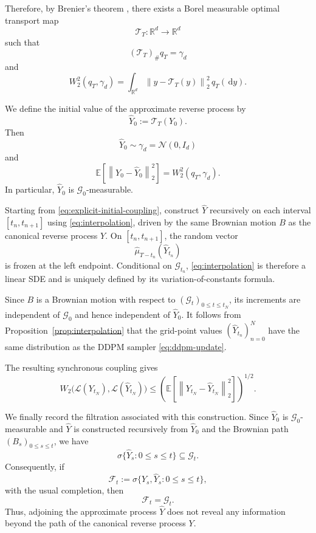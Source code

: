 \documentclass[11pt]{article}
\theoremstyle{definition}
\newcommand{\R}{\mathbb{R}}
\newcommand{\E}{\mathbb{E}}
\newcommand{\Law}{\mathcal{L}}
\newcommand{\N}{\mathcal{N}}
\newcommand{\Id}{I_d}
\newcommand{\Wtwo}{W_2}
\newcommand{\norm}[1]{\left\lVert #1\right\rVert_2}
\newcommand{\dd}{\,\mathrm{d}}
\begin{document}
Therefore, by Brenier's theorem
\citep[Theorem~9.4]{villani2009optimal}, there exists a Borel
measurable optimal transport map
\[
    \mathcal T_T:\R^d\to\R^d
\]
such that
\[
    (\mathcal T_T)_{\#}q_T=\gamma_d
\]
and
\[
    W_2^2(q_T,\gamma_d)
    =
    \int_{\R^d}
    \norm{y-\mathcal T_T(y)}^2\,q_T(\dd y).
\]

We define the initial value of the approximate reverse process by
\begin{equation}
    \hat Y_0:=\mathcal T_T(Y_0).
    \label{eq:explicit-initial-coupling}
\end{equation}
Then
\[
    \hat Y_0\sim\gamma_d=\N(0,\Id)
\]
and
\begin{equation}
    \E\left[\norm{Y_0-\hat Y_0}^2\right]
    =
    W_2^2(q_T,\gamma_d).
    \label{eq:optimal-initial-cost}
\end{equation}
In particular, $\hat Y_0$ is $\mathcal G_0$-measurable.

Starting from \eqref{eq:explicit-initial-coupling}, construct
$\hat Y$ recursively on each interval $[t_n,t_{n+1}]$ using
\eqref{eq:interpolation}, driven by the same Brownian motion $B$ as
the canonical reverse process $Y$. On $[t_n,t_{n+1}]$, the random
vector
\[
    \hat\mu_{T-t_n}(\hat Y_{t_n})
\]
is frozen at the left endpoint. Conditional on $\mathcal G_{t_n}$,
\eqref{eq:interpolation} is therefore a linear SDE and is uniquely
defined by its variation-of-constants formula.

Since $B$ is a Brownian motion with respect to
$(\mathcal G_t)_{0\le t\le t_N}$, its increments are independent of
$\mathcal G_0$ and hence independent of $\hat Y_0$. It follows from
Proposition~\ref{prop:interpolation} that the grid-point values
$(\hat Y_{t_n})_{n=0}^N$ have the same distribution as the DDPM
sampler \eqref{eq:ddpm-update}.

The resulting synchronous coupling gives
\begin{equation}
    \Wtwo\bigl(\Law(Y_{t_N}),\Law(\hat Y_{t_N})\bigr)
    \le
    \left(
        \E\left[\norm{Y_{t_N}-\hat Y_{t_N}}^2\right]
    \right)^{1/2}.
    \label{eq:w2-coupling}
\end{equation}

We finally record the filtration associated with this construction.
Since $\hat Y_0$ is $\mathcal G_0$-measurable and $\hat Y$ is
constructed recursively from $\hat Y_0$ and the Brownian path
$(B_s)_{0\le s\le t}$, we have
\[
    \sigma\{\hat Y_s:0\le s\le t\}
    \subseteq\mathcal G_t.
\]
Consequently, if
\[
    \mathcal F_t
    :=
    \sigma\{Y_s,\hat Y_s:0\le s\le t\},
\]
with the usual completion, then
\[
    \mathcal F_t=\mathcal G_t.
\]
Thus, adjoining the approximate process $\hat Y$ does not reveal
any information beyond the path of the canonical reverse process
$Y$.
\end{document}
